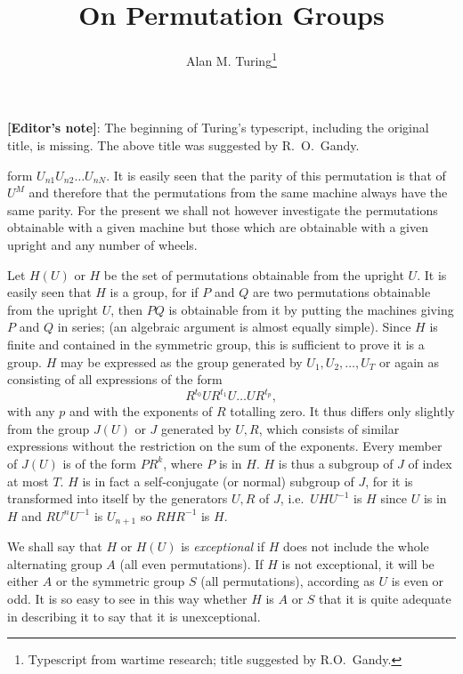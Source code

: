 \documentclass[12pt]{article}
\begin{document}
\title{On Permutation Groups}
\author{Alan M. Turing\thanks{Typescript from wartime research; title suggested by R.O.~Gandy.}}
\date{}
\maketitle

\noindent
{\bf [Editor’s note]}: The beginning of Turing’s typescript, including the original title, is missing.
The above title was suggested by R.~O.~Gandy.

\medskip

\noindent
\textellipsis{} form $U_{n1} U_{n2} \dots U_{nN}$. It is easily seen that the parity of this permutation is that of $U^M$ and therefore that the permutations from the same machine always have the same parity. For the present we shall not however investigate the permutations obtainable with a given machine but those which are obtainable with a given upright and any number of wheels.

\medskip

Let $H(U)$ or $H$ be the set of permutations obtainable from the upright $U$. It is easily seen that $H$ is a group, for if $P$ and $Q$ are two permutations obtainable from the upright $U$, then $PQ$ is obtainable from it by putting the machines giving $P$ and $Q$ in series; (an algebraic argument is almost equally simple). Since $H$ is finite and contained in the symmetric group, this is sufficient to prove it is a group. $H$ may be expressed as the group generated by $U_1, U_2, \dots, U_T$ or again as consisting of all expressions of the form
\[
R^{t_0} U R^{t_1} U \dots U R^{t_p},
\]
with any $p$ and with the exponents of $R$ totalling zero. It thus differs only slightly from the group $J(U)$ or $J$ generated by $U, R$, which consists of similar expressions without the restriction on the sum of the exponents. Every member of $J(U)$ is of the form $PR^k$, where $P$ is in $H$. $H$ is thus a subgroup of $J$ of index at most $T$. $H$ is in fact a self‐conjugate (or normal) subgroup of $J$, for it is transformed into itself by the generators $U,R$ of $J$, i.e.\ $UHU^{-1}$ is $H$ since $U$ is in $H$ and $R U^n U^{-1}$ is $U_{n+1}$ so $RHR^{-1}$ is $H$.

\medskip

We shall say that $H$ or $H(U)$ is {\em exceptional} if $H$ does not include the whole alternating group $A$ (all even permutations). If $H$ is not exceptional, it will be either $A$ or the symmetric group $S$ (all permutations), according as $U$ is even or odd. It is so easy to see in this way whether $H$ is $A$ or $S$ that it is quite adequate in describing it to say that it is unexceptional.
\end{document}
